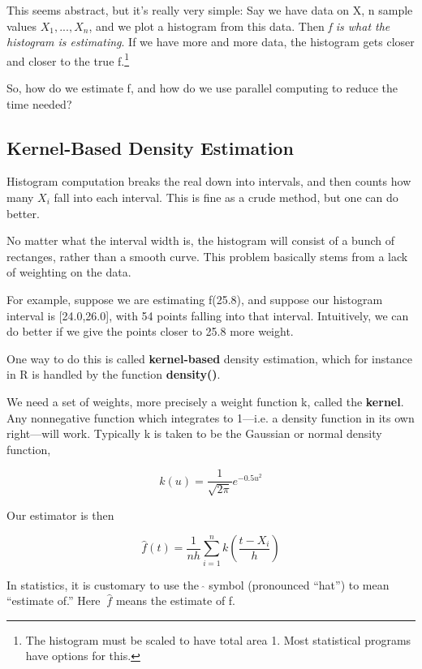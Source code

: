 This seems abstract, but it's really very simple:  Say we have data on
X, n sample values $X_1,...,X_n$, and we plot a histogram from this
data.  Then {\it f is what the histogram is estimating}.  If we have
more and more data, the histogram gets closer and closer to the true
f.\footnote{The histogram must be scaled to have total area 1.  Most
statistical programs have options for this.}

So, how do we estimate f, and how do we use parallel computing to reduce
the time needed?

\subsection{Kernel-Based Density Estimation}

Histogram computation breaks the real down into intervals, and then
counts how many $X_i$ fall into each interval.  This is fine as a crude
method, but one can do better.

No matter what the interval width is, the histogram will consist of a
bunch of rectanges, rather than a smooth curve.  This problem basically
stems from a lack of weighting on the data.

For example, suppose we are estimating f(25.8), and suppose our
histogram interval is [24.0,26.0], with 54 points falling into that
interval.  Intuitively, we can do better if we give the points closer to
25.8 more weight.

One way to do this is called {\bf kernel-based} density estimation,
which for instance in R is handled by the function {\bf density()}.

We need a set of weights, more precisely a weight function k, called the
{\bf kernel}.  Any nonnegative function which integrates to 1---i.e. a
density function in its own right---will work.  Typically k is taken to
be the Gaussian or normal density function,

\begin{equation}
\label{gaussk}
k(u) = \frac{1}{\sqrt{2 \pi}} e^{-0.5u^2}
\end{equation}

Our estimator is then

\begin{equation}
\label{kernelest}
\widehat{f}(t) = \frac{1}{nh} \sum_{i=1}^{n} k \left ( \frac{t-X_i}{h} \right )
\end{equation}

In statistics, it is customary to use the $\ \widehat{}$ symbol
(pronounced ``hat'') to mean ``estimate of.''  Here $\ \widehat{f}$
means the estimate of f.

